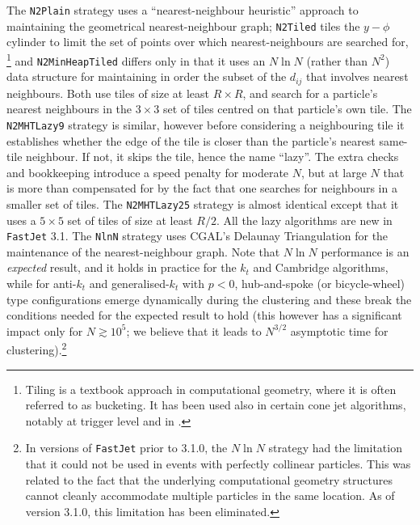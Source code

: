 \documentclass[12pt,a4]{article}
\newcommand{\fastjet}{\texttt{FastJet}\xspace}
\newcommand{\ttt}[1]{{\small\texttt{#1}}}
\begin{document}
The \ttt{N2Plain} strategy uses a ``nearest-neighbour heuristic''
\cite{Anderberg} approach to maintaining the geometrical
nearest-neighbour graph; \ttt{N2Tiled} tiles the $y-\phi$ cylinder
to limit the set of points over which nearest-neighbours are searched
for,%
\footnote{Tiling is a textbook approach in computational geometry,
  where it is often referred to as bucketing. It has been used also in
  certain cone jet algorithms, notably at trigger level and in
  \cite{Sonnenschein}.} %
and \ttt{N2MinHeapTiled} differs only in that it uses an $N\ln N$
(rather than $N^2$) data structure for maintaining in order the subset
of the $d_{ij}$ that involves nearest neighbours.
%
Both use tiles of size at least $R\times R$, and search for a
particle's nearest neighbours in the $3\times 3$ set of tiles centred
on that particle's own tile.
%
The \ttt{N2MHTLazy9} strategy is similar, however before considering a
neighbouring tile it establishes whether the edge of the tile is
closer than the particle's nearest same-tile neighbour.
%
If not, it skips the tile, hence the name ``lazy''.
%
The extra checks and bookkeeping introduce a speed penalty for
moderate $N$, but at large $N$ that is more than compensated for by
the fact that one searches for neighbours in a smaller set
of tiles.
%
The \ttt{N2MHTLazy25} strategy is almost identical except that it uses
a $5\times 5$ set of tiles of size at least $R/2$.
%
All the lazy algorithms are new in \fastjet 3.1.
%
The \ttt{NlnN} strategy uses CGAL's Delaunay Triangulation
\cite{CGAL} for the maintenance of the nearest-neighbour graph.
%
Note that $N \ln N$ performance is an \emph{expected} result, and
it holds in practice for the $k_t$ and Cambridge algorithms, while for
anti-$k_t$ and generalised-$k_t$ with $p<0$, hub-and-spoke (or
bicycle-wheel) type configurations emerge dynamically during the
clustering and these break the conditions needed for the expected
result to hold (this however has a significant impact only for $N
\gtrsim 10^5$; we believe that it leads to $N^{3/2}$ asymptotic time
for clustering).\footnote{%
  In versions of \fastjet prior to 3.1.0, the $N \ln N$ strategy had
  the limitation that it could not be used in events with perfectly
  collinear particles.
  This was related to the fact that the underlying computational geometry
  structures cannot cleanly accommodate multiple particles in the same
  location.
  As of version 3.1.0, this limitation has been eliminated.
}
\end{document}

